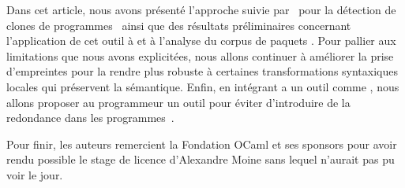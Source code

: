 Dans cet article, nous avons présenté l'approche suivie par~{\Asak} pour
la détection de clones de programmes~{\OCaml} ainsi que des résultats
préliminaires concernant l'application de cet outil à {\LearnOCaml}
et à l'analyse du corpus de paquets {\Opam}.
%
Pour pallier aux limitations que nous avons explicitées, nous allons continuer
à améliorer la prise d'empreintes pour la rendre plus robuste à certaines
transformations syntaxiques locales qui préservent la sémantique.
%
Enfin, en intégrant {\Asak} a un outil comme {\Merlin}, nous allons proposer
au programmeur un outil pour éviter d'introduire de la redondance dans
les programmes~{\OCaml}.

Pour finir, les auteurs remercient la Fondation OCaml et ses sponsors pour
avoir rendu possible le stage de licence d'Alexandre Moine sans lequel
{\Asak} n'aurait pas pu voir le jour.

